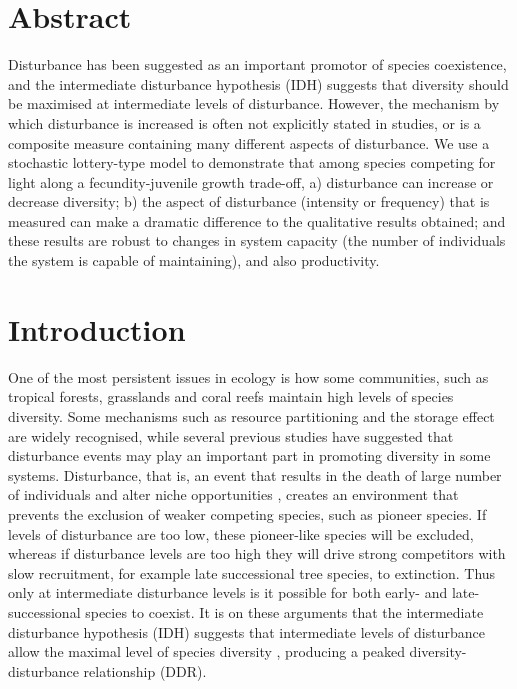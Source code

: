 \newpage
{}
\vspace*{\fill}
\section*{Abstract}
Disturbance has been suggested as an important promotor of species coexistence, and the intermediate disturbance hypothesis (IDH) suggests that diversity should be maximised at intermediate levels of disturbance. However, the mechanism by which disturbance is increased is often not explicitly stated in studies, or is a composite measure containing many different aspects of disturbance. We use a stochastic lottery-type model to demonstrate that among species competing for light along a fecundity-juvenile growth trade-off, a) disturbance can increase or decrease diversity;  b) the aspect of disturbance (intensity or frequency) that is measured can make a dramatic difference to the qualitative results obtained; and these results are robust to changes in system capacity (the number of individuals the system is capable of maintaining), and also productivity.
\vspace*{\fill}
\newpage
\section{Introduction}
\label{intro}
One of the most persistent issues in ecology is how some communities, such as tropical forests, grasslands and coral reefs maintain high levels of species diversity. Some mechanisms such as resource partitioning \citep[e.g.][]{sala1989resource,schoener1974resource} and the storage effect \citep{warner1985coexistence} are widely recognised, while several previous studies \citep[e.g.][]{denslow1987tropical,sousa1984role} have suggested that disturbance events may play an important part in promoting diversity in some systems. Disturbance, that is, an event that results in the death of large number of individuals and alter niche opportunities \citep{shea2004moving}, creates an environment that prevents the exclusion of weaker competing species, such as pioneer species. If levels of disturbance are too low, these pioneer-like species will be excluded, whereas if disturbance levels are too high they will drive strong competitors with slow recruitment, for example late successional tree species, to extinction. Thus only at intermediate disturbance levels is it possible for both early- and late- successional species to coexist. It is on these arguments that the intermediate disturbance hypothesis (IDH) suggests that intermediate levels of disturbance allow the maximal level of species diversity \citep[e.g.][]{connell1978diversity,huston1979general}, producing a peaked diversity-disturbance relationship (DDR).


